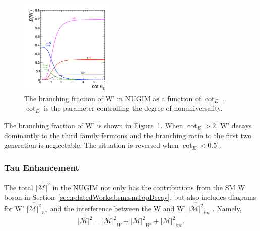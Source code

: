 \begin{figure}[ht]
    \centering
    \includegraphics[width=0.4\textwidth]{chapters/RelatedWorks/sectionBSM/figures/WPDecayBr.png}
    \caption{The branching fraction of W' in NUGIM as a function of $\cot_E$ \cite{Sirunyan:2018lbg}. $\cot_E$ is the parameter controlling the degree of nonuniversality.}
    \label{fig:relatedWorks:bsm:WPrime:braching}
\end{figure}



\noindent The branching fraction of W' is shown in Figure~\ref{fig:relatedWorks:bsm:WPrime:braching}. When $\cot_E > 2$, W' decays dominantly to the third family fermions and the branching ratio to the first two generation is neglectable. The situation is reversed when $\cot_E<0.5$ .


\subsubsection{Tau Enhancement}

The total $\overline{ |\mathcal{M}|^2 }$ in the NUGIM not only has the contributions from the SM W boson in Section~\ref{sec:relatedWorks:bsm:smTopDecay}, but also includes diagrams for W' $\overline{ |\mathcal{M}|^2 } _{W'} $  and the interference between the W and W' $\overline{ |\mathcal{M}|^2 } _{int} $ . Namely,
\begin{equation}
	\overline{ |\mathcal{M}|^2 }  = \overline{ |\mathcal{M}|^2 } _{W} +  \overline{ |\mathcal{M}|^2 } _{W'} +  \overline{ |\mathcal{M}|^2 } _{int} .
\end{equation}


